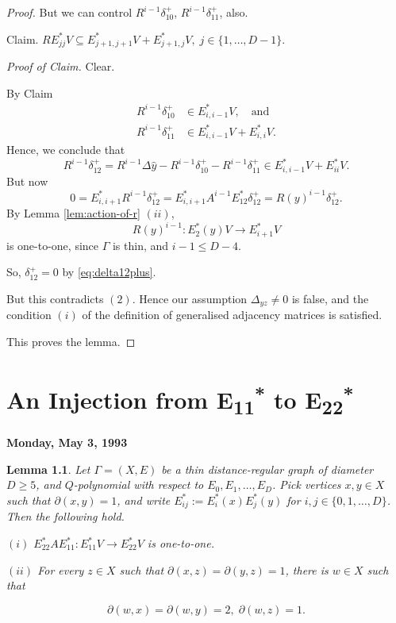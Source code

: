 \documentclass[
]{book}
\newtheorem{lemma}{Lemma}[chapter]
\theoremstyle{definition}
\theoremstyle{definition}
\theoremstyle{definition}
\theoremstyle{definition}
\theoremstyle{remark}
\begin{document}
\begin{proof}
But we can control \(R^{i-1}\delta^+_{10}\), \(R^{i-1}\delta^+_{11}\), also.

Claim. \(RE^*_{jj}V \subseteq E^*_{j+1,j+1}V + E^*_{j+1, j}V, \; j\in \{1, \ldots, D-1\}.\)

\emph{Proof of Claim.} Clear.

By Claim
\begin{align}
R^{i-1}\delta^+_{10} &\in E^*_{i,i-1}V, \quad \text{and}\\
R^{i-1}\delta^+_{11} & \in E^*_{i,i-1}V + E^*_{i,i}V.
\end{align}
Hence, we conclude that
\[R^{i-1}\delta^+_{12} = R^{i-1}\Delta \hat{y} - R^{i-1}\delta^+_{10} - R^{i-1}\delta^+_{11}\in E^*_{i,i-1}V + E^*_{ii}V.\]
But now
\begin{equation}
0 = E^*_{i,i+1}R^{i-1}\delta^+_{12} = E^*_{i,i+1}A^{i-1}E^*_{12}\delta^+_{12} = R(y)^{i-1}\delta^+_{12}. \label{eq:delta12plus}
\end{equation}
By Lemma \ref{lem:action-of-r} \((ii)\),
\[R(y)^{i-1}: E^*_2(y)V \longrightarrow E^*_{i+1}V\]
is one-to-one, since \(\Gamma\) is thin, and \(i-1\leq D-4\).

So, \(\delta^+_{12}=0\) by \eqref{eq:delta12plus}.

But this contradicts \((2)\). Hence our assumption \(\Delta_{yz}\neq 0\) is false, and the condition \((i)\) of the definition of generalised adjacency matrices is satisfied.

This proves the lemma.
\end{proof}

\hypertarget{lec38}{%
\chapter{\texorpdfstring{An Injection from E\textsubscript{11}\textsuperscript{*} to E\textsubscript{22}\textsuperscript{*}}{An Injection from E11* to E22*}}\label{lec38}}

\textbf{Monday, May 3, 1993}

\begin{lemma}
\protect\hypertarget{lem:e11star-to-e22star}{}\label{lem:e11star-to-e22star}Let \(\Gamma = (X, E)\) be a thin distance-regular graph of diameter \(D\geq 5\), and \(Q\)-polynomial with respect to \(E_0, E_1, \ldots, E_D\).
Pick vertices \(x,y\in X\) such that \(\partial(x,y) = 1\), and write \(E^*_{ij}:=E^*_i(x)E^*_j(y)\) for \(i,j\in \{0, 1, \ldots, D\}\). Then the following hold.

\((i)\) \(E^*_{22}AE^*_{11}: E^*_{11}V \to E^*_{22}V\) is one-to-one.

\((ii)\) For every \(z\in X\) such that \(\partial(x,z) = \partial(y,z) = 1\), there is \(w\in X\) such that

\[\partial(w,x) = \partial(w,y) = 2, \; \partial(w,z)=1.\]
\end{lemma}
\end{document}
